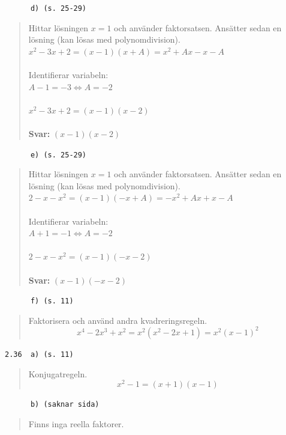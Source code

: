 \documentclass[a4paper]{article}
\newcommand{\tskcol}[1]{\textcolor{tskcol}{#1}}
\begin{document}
	\texttt{\tskcol{~~~~~~d) (s. 25-29)}}
	\begin{quotation}
		\noindent
		Hittar lösningen $x=1$ och använder faktorsatsen. Ansätter sedan en lösning (kan lösas med polynomdivision). \\
		$x^2-3x+2=(x-1)(x+A)=x^2+Ax-x-A$ \\ \\
		Identifierar variabeln: \\
		$A-1=-3 \Leftrightarrow A=-2$ \\ \\
		$x^2-3x+2=(x-1)(x-2)$
		\\ \\
		\textbf{Svar:} $(x-1)(x-2)$
	\end{quotation}
	
	\texttt{\tskcol{~~~~~~e) (s. 25-29)}}
	\begin{quotation}
		\noindent
		Hittar lösningen $x=1$ och använder faktorsatsen. Ansätter sedan en lösning (kan lösas med polynomdivision). \\
		$2-x-x^2=(x-1)(-x+A)=-x^2+Ax+x-A$ \\ \\
		Identifierar variabeln: \\
		$A+1=-1 \Leftrightarrow A=-2$ \\ \\
		$2-x-x^2=(x-1)(-x-2)$
		\\ \\
		\textbf{Svar:} $(x-1)(-x-2)$
	\end{quotation}
	
	\texttt{\tskcol{~~~~~~f) (s. 11)}}
	\begin{quotation}
		\noindent
		Faktorisera och använd andra kvadreringsregeln.
		\[x^4-2x^3+x^2=x^2(x^2-2x+1)=x^2(x-1)^2\]
	\end{quotation}
	
	\texttt{\tskcol{2.36~~a) (s. 11)}}
	\begin{quotation}
		\noindent
		Konjugatregeln.
		\[x^2-1=(x+1)(x-1)\]
	\end{quotation}
	
	\texttt{\tskcol{~~~~~~b) (saknar sida)}}
	\begin{quotation}
		\noindent
		Finns inga reella faktorer.
	\end{quotation}
	
\end{document}
